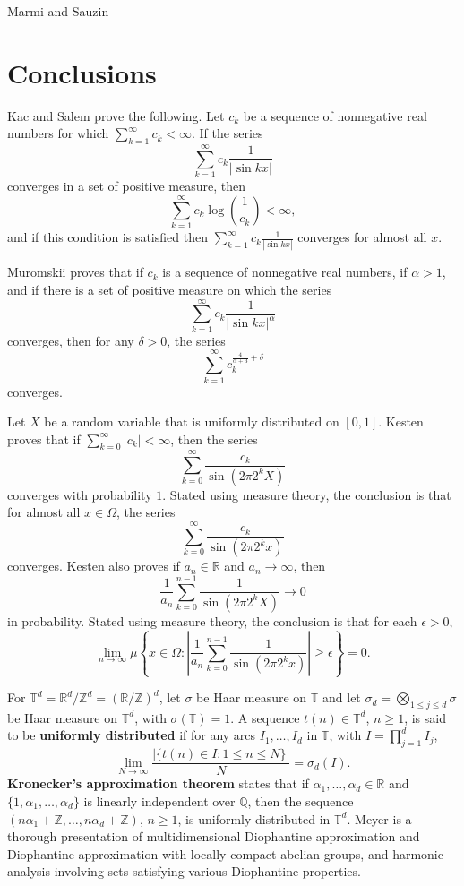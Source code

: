 \documentclass{amsart}
\begin{document}
Marmi and Sauzin \cite{sauzin}


\section{Conclusions}
Kac and Salem \cite{MR0089284} prove the following. Let $c_k$ be a sequence of nonnegative real numbers for which 
$\sum_{k=1}^\infty c_k<\infty$. If the series
 \[
 \sum_{k=1}^\infty c_k \frac{1}{|\sin kx|}
 \]
 converges in a set of positive measure, then
 \[
 \sum_{k=1}^\infty c_k \log\left( \frac{1}{c_k} \right)<\infty,
 \]
 and if this condition is satisfied then $ \sum_{k=1}^\infty c_k \frac{1}{|\sin kx|}$ converges for almost all $x$.

Muromskii \cite[p.~54, Theorem 1]{MR0161081} proves that if $c_k$ is a sequence of nonnegative real numbers,  if $\alpha>1$,
 and if there is a set of positive measure on which the series
 \[
 \sum_{k=1}^\infty c_k \frac{1}{|\sin kx|^\alpha}
 \]
 converges, then for any $\delta>0$, the series
 \[
 \sum_{k=1}^\infty c_k^{\frac{4}{\alpha+3}+\delta}
 \]
 converges. 

Let $X$ be a random variable that is uniformly distributed on $[0,1]$. Kesten \cite[p.~111, Theorem 1 ]{MR0104640} proves that
 if $\sum_{k=0}^\infty |c_k|<\infty$, then the series
 \[
 \sum_{k=0}^\infty \frac{c_k}{\sin (2\pi 2^k X)}
 \]
 converges with probability $1$. Stated using measure theory, the conclusion is that for almost all $x \in \Omega$, the series 
 \[
  \sum_{k=0}^\infty \frac{c_k}{\sin (2\pi 2^k x)}
 \]
 converges. Kesten \cite[p.~114, Theorem 3]{MR0104640} also proves if $a_n \in \mathbb{R}$ and $a_n \to \infty$, then
 \[
 \frac{1}{a_n} \sum_{k=0}^{n-1} \frac{1}{\sin(2\pi 2^k X)} \to 0
 \]
 in probability. Stated using measure theory, the conclusion is that for each $\epsilon>0$,
 \[
 \lim_{n \to \infty} \mu\left\{x \in \Omega: \left|  \frac{1}{a_n} \sum_{k=0}^{n-1} \frac{1}{\sin(2\pi 2^k x)} \right| \geq \epsilon \right\} =0.
 \]
 
For $\mathbb{T}^d = \mathbb{R}^d / \mathbb{Z}^d = (\mathbb{R}/\mathbb{Z})^d$, 
let $\sigma$ be Haar measure on $\mathbb{T}$ and let $\sigma_d=\bigotimes_{1 \leq j \leq d} \sigma$ be Haar measure on $\mathbb{T}^d$, with $\sigma(\mathbb{T})=1$.
A sequence $t(n) \in \mathbb{T}^d$, $n \geq 1$,
is said to be \textbf{uniformly distributed} if for any arcs $I_1,\ldots,I_d$ in $\mathbb{T}$, with $I=\prod_{j=1}^d I_j$,
\[
\lim_{N \to \infty} \frac{|\{t(n) \in I : 1 \leq n \leq N\}|}{N} = \sigma_d(I).
\]
\textbf{Kronecker's approximation theorem} \cite[p.~108, Theorem 6.3]{travaglini} states that if
$\alpha_1,\ldots,\alpha_d \in \mathbb{R}$ and $\{1,\alpha_1,\ldots,\alpha_d\}$ is linearly independent over $\mathbb{Q}$,
then the sequence $(n\alpha_1+\mathbb{Z},\ldots,n\alpha_d+\mathbb{Z})$, $n \geq 1$, is uniformly distributed in $\mathbb{T}^d$.
Meyer \cite{meyer} is
a thorough presentation of
multidimensional Diophantine approximation and Diophantine approximation with locally compact abelian groups, and harmonic
analysis involving sets satisfying various Diophantine properties.
\end{document}
